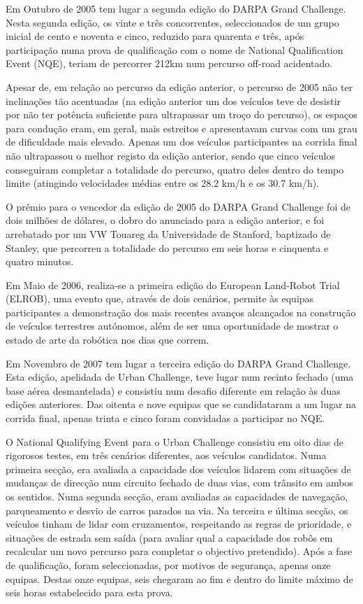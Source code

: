 \documentclass[a4paper,10pt]{texRel}
\begin{document}
Em Outubro de 2005 tem lugar a segunda edição do DARPA Grand Challenge. Nesta segunda edição, os vinte e três concorrentes, seleccionados de um grupo inicial de cento e noventa e cinco, reduzido para quarenta e três, após participação numa prova de qualificação com o nome de National Qualification Event (NQE), teriam de percorrer 212km num percurso off-road acidentado. 

Apesar de, em relação ao percurso da edição anterior, o percurso de 2005 não ter inclinações tão acentuadas (na edição anterior um dos veículos teve de desistir por não ter potência suficiente para ultrapassar um troço do percurso), os espaços para condução eram, em geral, mais estreitos e apresentavam curvas com um grau de dificuldade mais elevado. Apenas um dos veículos participantes na corrida final não ultrapassou o melhor registo da edição anterior, sendo que cinco veículos conseguiram completar a totalidade do percurso, quatro deles dentro do tempo limite (atingindo velocidades médias entre os 28.2 km/h e os 30.7 km/h).

O prémio para o vencedor da edição de 2005 do DARPA Grand Challenge foi de dois milhões de dólares, o dobro do anunciado para a edição anterior, e foi arrebatado por um VW Touareg da Universidade de Stanford, baptizado de Stanley, que percorreu a totalidade do percurso em seis horas e cinquenta e quatro minutos.

Em Maio de 2006, realiza-se a primeira edição do European Land-Robot Trial (ELROB), uma evento que, através de dois cenários, permite às equipas participantes a demonstração dos mais recentes avanços alcançados na construção de veículos terrestres autónomos, além de ser uma oportunidade de mostrar o estado de arte da robótica nos dias que correm.

Em Novembro de 2007 tem lugar a terceira edição do DARPA Grand Challenge. Esta edição, apelidada de Urban Challenge, teve lugar num recinto fechado (uma base aérea desmantelada) e consistiu num desafio diferente em relação às duas edições anteriores. Das oitenta e nove equipas que se candidataram a um lugar na corrida final, apenas trinta e cinco foram convidadas a participar no NQE. 

O National Qualifying Event para o Urban Challenge consistiu em oito dias de rigorosos testes, em três cenários diferentes, aos veículos candidatos. Numa primeira secção, era avaliada a capacidade dos veículos lidarem com situações de mudanças de direcção num circuito fechado de duas vias, com trânsito em ambos os sentidos. Numa segunda secção, eram avaliadas as capacidades de navegação, parqueamento e desvio de carros parados na via. Na terceira e última secção, os veículos tinham de lidar com cruzamentos, respeitando as regras de prioridade, e situações de estrada sem saída (para avaliar qual a capacidade dos robôs em recalcular um novo percurso para completar o objectivo pretendido). Após a fase de qualificação, foram seleccionadas, por motivos de segurança, apenas onze equipas. Destas onze equipas, seis chegaram ao fim e dentro do limite máximo de seis horas estabelecido para esta prova. 
\end{document}
